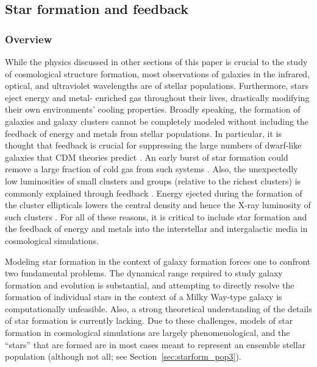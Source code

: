 \subsection{Star formation and feedback}
\label{sec.ov.star}

\subsubsection{Overview}

While the physics discussed in other sections of this paper is crucial
to the study of cosmological structure formation, most observations of
galaxies in the infrared, optical, and ultraviolet wavelengths are of
stellar populations.  Furthermore, stars eject energy and metal-
enriched gas throughout their lives, drastically modifying their own
environments' cooling properties.  Broadly speaking, the formation of
galaxies and galaxy clusters cannot be completely modeled without
including the feedback of energy and metals from stellar populations.
In particular, it is thought that feedback is crucial for suppressing
the large numbers of dwarf-like galaxies that CDM theories predict
\citep{1991ApJ...381...14L,1991ApJ...379...52W}.  An early burst of
star formation could remove a large fraction of cold gas from such
systems \citep{1978MNRAS.183..341W,1991ApJ...367...45C}.  Also, the
unexpectedly low luminosities of small clusters and groups (relative
to the richest clusters) is commonly explained through feedback
\citep{1991ApJ...383..104K}.  Energy ejected during the formation of
the cluster ellipticals lowers the central density and hence the X-ray
luminosity of such clusters \citep{1997ApJ...484L..21C}.  For all of
these reasons, it is critical to include star formation and the
feedback of energy and metals into the interstellar and intergalactic
media in cosmological simulations.

Modeling star formation in the context of galaxy formation forces one
to confront two fundamental problems. The dynamical range required to
study galaxy formation and evolution is substantial, and attempting to
directly resolve the formation of individual stars in the context of a
Milky Way-type galaxy is computationally unfeasible.  Also, a strong
theoretical understanding of the details of star formation is
currently lacking.  Due to these challenges, models of star formation
in cosmological simulations are largely phenomenological, and the
``stars'' that are formed are in most cases meant to represent an
ensemble stellar population (although not all; see
Section~\ref{sec:starform_pop3}).

